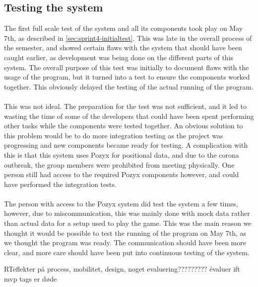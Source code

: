 \subsection{Testing the system}
The first full scale test of the system and all its components took play on May 7th, as described in \autoref{sec:sprint4-initialtest}.
This was late in the overall process of the semester, and showed certain flaws with the system that should have been caught earlier, as development was being done on the different parts of this system.
The overall purpose of this test was initially to document flaws with the usage of the program, but it turned into a test to ensure the components worked together.
This obviously delayed the testing of the actual running of the program.
\\\\
This was not ideal.
The preparation for the test was not sufficient, and it led to wasting the time of some of the developers that could have been spent performing other tasks while the components were tested together.
An obvious solution to this problem would be to do more integration testing as the project was progressing and new components became ready for testing.
A complication with this is that this system uses Pozyx for positional data, and due to the corona outbreak, the group members were prohibited from meeting physically.
One person still had access to the required Pozyx components however, and could have performed the integration tests.
\\\\
The person with access to the Pozyx system did test the system a few times, however, due to miscommunication, this was mainly done with mock data rather than actual data for a setup used to play the game.
This was the main reason we thought it would be possible to test the running of the program on May 7th, as we thought the program was ready.
The communication should have been more clear, and more care should have been put into continuous testing of the system.


RTeflekter på process, mobilitet, design, noget evaluering?????????
évaluer ift mvp
tags 
er døde